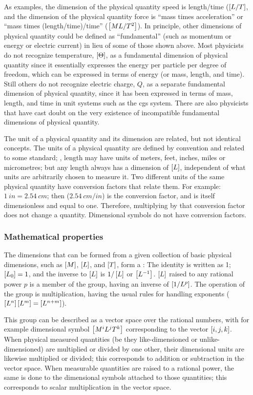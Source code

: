 As examples, the dimension of the physical quantity speed is length/time ($\left[{L/T}\right]$, and the dimension of the physical quantity force is ``mass times acceleration'' or ``mass times (length/time)/time'' ($\left[{ML/T^2}\right]$). In principle, other dimensions of physical quantity could be defined as ``fundamental'' (such as momentum or energy or electric current) in lieu of some of those shown above. Most physicists do not recognize temperature, $\left[{\Theta}\right]$, as a fundamental dimension of physical quantity since it essentially expresses the energy per particle per degree of freedom, which can be expressed in terms of energy (or mass, length, and time). Still others do not recognize electric charge, $Q$, as a separate fundamental dimension of physical quantity, since it has been expressed in terms of mass, length, and time in unit systems such as the cgs system. There are also physicists that have cast doubt on the very existence of incompatible fundamental dimensions of physical quantity.

The unit of a physical quantity and its dimension are related, but not identical concepts. The units of a physical quantity are defined by convention and related to some standard; \eg, length may have units of meters, feet, inches, miles or micrometres; but any length always has a dimension of $\left[{L}\right]$, independent of what units are arbitrarily chosen to measure it. Two different units of the same physical quantity have conversion factors that relate them. For example: $\SI{1}{in} = \SI{2.54}{cm}$; then ($\SI{2.54}{cm/in}$) is the conversion factor, and is itself dimensionless and equal to one. Therefore, multiplying by that conversion factor does not change a quantity. Dimensional symbols do not have conversion factors.


\subsubsection{Mathematical properties}
The dimensions that can be formed from a given collection of basic physical dimensions, such as $\left[{M}\right]$, $\left[{L}\right]$, and $\left[{T}\right]$, form a : The identity is written as 1; $\left[{L_0}\right] = 1$, and the inverse to $\left[{L}\right]$ is $1/\left[{L}\right]$ or $\left[{L^{-1}}\right]$. $\left[{L}\right]$ raised to any rational power $p$ is a member of the group, having an inverse of $\left[{1/L^p}\right]$. The operation of the group is multiplication, having the usual rules for handling exponents ($\left[{L^n}\right]\left[{L^m}\right] = \left[{L^{n+m}}\right]$).

This group can be described as a vector space over the rational numbers, with for example dimensional symbol $\left[{M^iL^jT^k}\right]$ corresponding to the vector $\left[{i,j,k}\right]$. When physical measured quantities (be they like-dimensioned or unlike-dimensioned) are multiplied or divided by one other, their dimensional units are likewise multiplied or divided; this corresponds to addition or subtraction in the vector space. When measurable quantities are raised to a rational power, the same is done to the dimensional symbols attached to those quantities; this corresponds to scalar multiplication in the vector space.

